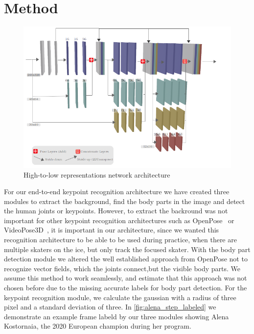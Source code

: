 

\chapter{Method} %

\label{method} %


\vspace*{\fill}
\begin{figure}[th]
    \centering
    \includegraphics[width=150mm]{Figures/custom_hrnet_lines.png}
    \decoRule
    \caption[HRNetV3]{High-to-low representations network architecture}
    \label{fig:custom_hrnet}
\end{figure}
For our end-to-end keypoint recognition architecture we have created three modules to extract the background,
find the body parts in the image and detect the human joints or keypoints.
However, to extract the backround was not important for other keypoint recognition architectures such as
OpenPose~\cite{openpose} or VideoPose3D~\cite{videopose3d}, it is important in our architecture, since we wanted
this recognition architecture to be able to be used during practice, when there are multiple skaters on the ice,
but only track the focused skater.
With the body part detection module we altered the well established approach from OpenPose not to recognize vector
fields, which the joints connect,but the visible body parts.
We assume this method to work seamlessly, and estimate that this approach was not chosen before due to the missing
accurate labels for body part detection.
For the keypoint recognition module, we calculate the gaussian with a radius of three pixel and a standard deviation of
three.
In \autoref{fig:alena_step_labeled} we demonstrate an example frame labeld by our three modules
showing Alena Kostornaia, the 2020 European champion during her program.

